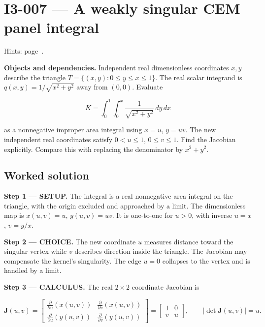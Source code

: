 \documentclass[11pt,oneside,openany]{book}
\begin{document}
\section{I3-007 --- A weakly singular CEM panel integral}
\label{problem:I3-007}
{\small Hints: page~\pageref{hints:I3-007}.}\par\medskip

\textbf{Objects and dependencies.} Independent real dimensionless coordinates \(x,y\) describe the triangle \(T=\{(x,y):0\le y\le x\le1\}\). The real scalar integrand is \(q(x,y)=1/\sqrt{x^2+y^2}\) away from \((0,0)\). Evaluate

\[
K=\int_0^1\int_0^x\frac{1}{\sqrt{x^2+y^2}}\,dy\,dx
\]

as a nonnegative improper area integral using \(x=u\), \(y=uv\). The new independent real coordinates satisfy \(0<u\le1\), \(0\le v\le1\). Find the Jacobian explicitly. Compare this with replacing the denominator by \(x^2+y^2\).
\subsection*{Worked solution}

\textbf{Step 1 --- SETUP.} The integral is a real nonnegative area integral on the triangle, with the origin excluded and approached by a limit. The dimensionless map is \(x(u,v)=u\), \(y(u,v)=uv\). It is one-to-one for \(u>0\), with inverse \(u=x\), \(v=y/x\).

\begin{ChoiceStep}
\textbf{Step 2 --- CHOICE.} The new coordinate \(u\) measures distance toward the singular vertex while \(v\) describes direction inside the triangle. The Jacobian may compensate the kernel's singularity. The edge \(u=0\) collapses to the vertex and is handled by a limit.

\end{ChoiceStep}
\textbf{Step 3 --- CALCULUS.} The real \(2\times2\) coordinate Jacobian is

\[
\mathbf J(u,v)=\begin{bmatrix}
\frac{\partial}{\partial u}(x(u,v))&\frac{\partial}{\partial v}(x(u,v))\\
\frac{\partial}{\partial u}(y(u,v))&\frac{\partial}{\partial v}(y(u,v))
\end{bmatrix}
=\begin{bmatrix}1&0\\v&u\end{bmatrix},\qquad |\det\mathbf J(u,v)|=u.
\]
\end{document}
